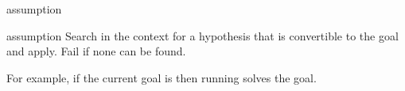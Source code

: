 \begin{tactic}{assumption}
  \begin{tsyntax}[empty]{assumption}
  Search in the context for a hypothesis that is convertible to the goal
  and apply. Fail if none can be found.

  For example, if the current goal is
   then
  running 
  solves the goal.
  \end{tsyntax}
\end{tactic}
